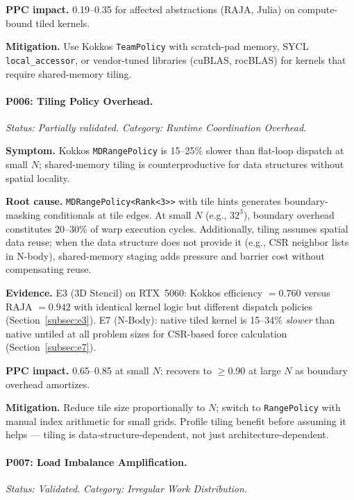 \noindent\textbf{PPC impact.} 0.19--0.35 for affected abstractions (RAJA, Julia)
on compute-bound tiled kernels.

\noindent\textbf{Mitigation.}
Use Kokkos \texttt{TeamPolicy} with scratch-pad memory, SYCL
\texttt{local\_accessor}, or vendor-tuned libraries (cuBLAS, rocBLAS) for
kernels that require shared-memory tiling.

\paragraph{P006: Tiling Policy Overhead.}
\textit{Status: Partially validated.}
\textit{Category: Runtime Coordination Overhead.}

\noindent\textbf{Symptom.}
Kokkos \texttt{MDRangePolicy} is 15--25\% slower than flat-loop dispatch at
small $N$; shared-memory tiling is counterproductive for data structures
without spatial locality.

\noindent\textbf{Root cause.}
\texttt{MDRangePolicy<Rank<3>{>}} with tile hints generates boundary-masking
conditionals at tile edges. At small $N$ (e.g., $32^3$), boundary overhead
constitutes 20--30\% of warp execution cycles. Additionally, tiling assumes
spatial data reuse; when the data structure does not provide it (e.g., CSR
neighbor lists in N-body), shared-memory staging adds pressure and barrier
cost without compensating reuse.

\noindent\textbf{Evidence.}
E3 (3D Stencil) on RTX~5060: Kokkos efficiency $= 0.760$ versus RAJA
$= 0.942$ with identical kernel logic but different dispatch policies
(Section~\ref{subsec:e3}). E7 (N-Body): native tiled kernel is 15--34\%
\emph{slower} than native untiled at all problem sizes for CSR-based force
calculation (Section~\ref{subsec:e7}).

\noindent\textbf{PPC impact.} 0.65--0.85 at small $N$; recovers to $\geq 0.90$ at
large $N$ as boundary overhead amortizes.

\noindent\textbf{Mitigation.}
Reduce tile size proportionally to $N$; switch to \texttt{RangePolicy} with
manual index arithmetic for small grids. Profile tiling benefit before
assuming it helps --- tiling is data-structure-dependent, not just
architecture-dependent.

\paragraph{P007: Load Imbalance Amplification.}
\textit{Status: Validated.}
\textit{Category: Irregular Work Distribution.}

